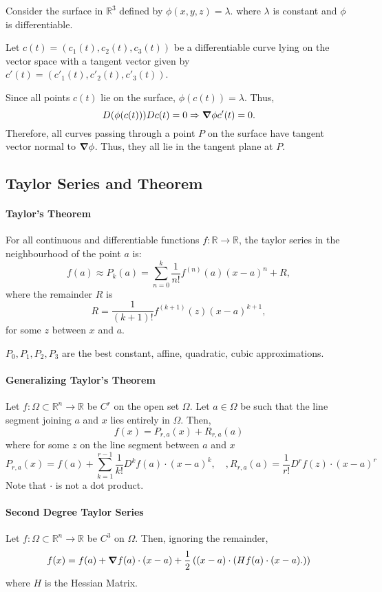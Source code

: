 Consider the surface in \(\mathbb{R}^3\) defined by \(\phi (x, y, z) = \lambda\).
where \(\lambda\) is constant and \(\phi\) is differentiable.

Let \(c(t) = \left(c_1(t), c_2(t), c_3(t)\right)\) be a differentiable curve
lying on the vector space with a tangent vector given by 
\(c'(t) = \left(c'_1(t), c'_2(t), c'_3(t)\right)\).

Since all points \(c(t)\) lie on the surface, \(\phi(c(t)) = \lambda\).
Thus,
\[
    D(\phi (c(t))) Dc(t) = 0 \Rightarrow \grad \phi c'(t) = 0.
\]
Therefore, all curves passing through a point \(P\) on the surface have
tangent vector normal to \(\grad \phi\). Thus, they all lie in the tangent
plane at \(P\).


\subsection{Taylor Series and Theorem}

\paragraph{Taylor's Theorem}
For all continuous and differentiable functions \(f: \mathbb{R}\to \mathbb{R}\),
the taylor series in the neighbourhood of the point \(a\) is:
\[
    f(a)
    \approx
    P_k(a) = 
    \sum_{n=0}^{k} \frac{1}{n!} f^{(n)}(a) (x-a)^n
    + R,
\]
where the remainder \(R\) is
\[
    R = \frac{1}{(k+1)!} f^{(k+1)}(z) (x-a)^{k + 1},
\]
for some \(z\) between \(x\) and \(a\).

\(P_0, P_1,  P_2, P_3\) are the best constant, affine, quadratic, cubic approximations.

\paragraph{Generalizing Taylor's Theorem}
Let \(f: \Omega\subset \mathbb{R}^n \to \mathbb{R}\) be \(C^r\) on the 
open set \(\Omega\).
Let \(a\in \Omega\) be such that the line segment joining \(a\) and \(x\)
lies entirely in \(\Omega\).  Then,
\[f(x) = P_{r, a}(x) + R_{r, a}(a)\]
where for some \(z\) on the line segment between \(a\) and \(x\)
\[ 
    P_{r,a}(x) = f(a) + \sum_{k=1}^{r-1} \frac{1}{k!} D^k f(a)\cdot(x-a)^k, 
    \quad,
    R_{r,a}(a) = \frac{1}{r!}D^r f(z) \cdot (x-a)^r
\]
Note that \(\cdot\) is not a dot product.

\paragraph{Second Degree Taylor Series}
Let \(f: \Omega\subset \mathbb{R}^n \to \mathbb{R}\) be \(C^3\) on \(\Omega\).
Then, ignoring the remainder,
\[
    f(x) = f(a) + \grad f(a)\cdot(x-a) 
    +
    \frac{1}{2} \left((x-a)\cdot \left(
        Hf(a)\cdot(x-a).
    \right) \right)
\]
where \(H\) is the Hessian Matrix.

